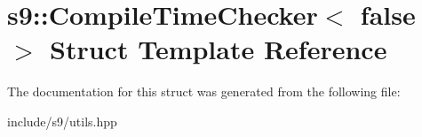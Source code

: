 \hypertarget{structs9_1_1CompileTimeChecker_3_01false_01_4}{\section{s9\-:\-:Compile\-Time\-Checker$<$ false $>$ Struct Template Reference}
\label{structs9_1_1CompileTimeChecker_3_01false_01_4}
}


The documentation for this struct was generated from the following file\-:\begin{DoxyCompactItemize}
\item 
include/s9/utils.\-hpp\end{DoxyCompactItemize}
